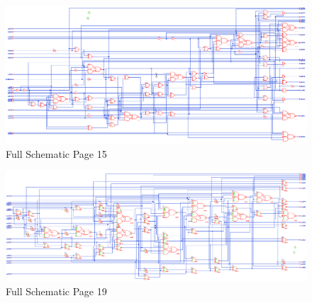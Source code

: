 \documentclass[11pt]{article}
\begin{document}
	
	\begin{figure}[H] 
		\centering 
		\includegraphics[width=0.7\linewidth]{"Pictures/Full Schematic Page 15"}
		\caption{Full Schematic Page 15} 
		\label{fig:Full-Schematic-Page-15} 
	\end{figure}
	
	
	\begin{figure}[H] 
		\centering 
		\includegraphics[width=0.7\linewidth]{"Pictures/Full Schematic Page 19"}
		\caption{Full Schematic Page 19} 
		\label{fig:Full-Schematic-Page-19} 
	\end{figure}
	
\end{document}
